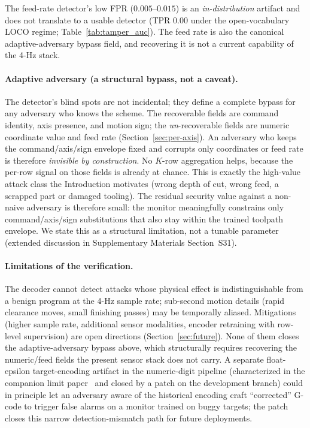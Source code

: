 \documentclass[sensors,article,submit,moreauthors,pdftex]{Definitions/mdpi}
\begin{document}
The feed-rate detector's low FPR ($0.005$--$0.015$) is an \emph{in-distribution} artifact and does not translate to a usable detector (TPR $0.00$ under the open-vocabulary LOCO regime; Table~\ref{tab:tamper_auc}). The feed rate is also the canonical adaptive-adversary bypass field, and recovering it is not a current capability of the 4-Hz stack.

\paragraph{Adaptive adversary (a structural bypass, not a caveat).} The detector's blind spots are not incidental; they define a complete bypass for any adversary who knows the scheme. The recoverable fields are command identity, axis presence, and motion sign; the \emph{un}-recoverable fields are numeric coordinate value and feed rate (Section~\ref{sec:per-axis}). An adversary who keeps the command/axis/sign envelope fixed and corrupts only coordinates or feed rate is therefore \emph{invisible by construction}. No $K$-row aggregation helps, because the per-row signal on those fields is already at chance. This is exactly the high-value attack class the Introduction motivates (wrong depth of cut, wrong feed, a scrapped part or damaged tooling). The residual security value against a non-naive adversary is therefore small: the monitor meaningfully constrains only command/axis/sign substitutions that also stay within the trained toolpath envelope. We state this as a structural limitation, not a tunable parameter (extended discussion in Supplementary Materials Section~S31).

\paragraph{Limitations of the verification.} The decoder cannot detect attacks whose physical effect is indistinguishable from a benign program at the 4-Hz sample rate; sub-second motion details (rapid clearance moves, small finishing passes) may be temporally aliased. Mitigations (higher sample rate, additional sensor modalities, encoder retraining with row-level supervision) are open directions (Section~\ref{sec:future}). None of them closes the adaptive-adversary bypass above, which structurally requires recovering the numeric/feed fields the present sensor stack does not carry. A separate float-epsilon target-encoding artifact in the numeric-digit pipeline (characterized in the companion limit paper~\cite{paperB_entropy} and closed by a patch on the development branch) could in principle let an adversary aware of the historical encoding craft ``corrected'' G-code to trigger false alarms on a monitor trained on buggy targets; the patch closes this narrow detection-mismatch path for future deployments.
\end{document}
